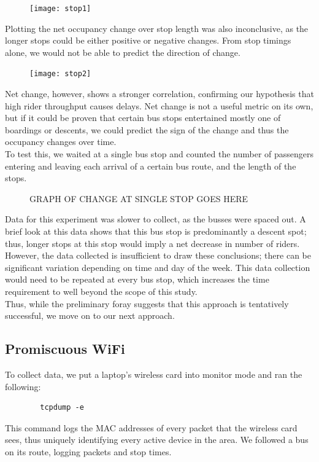 \documentclass[letterpaper,abstract=on,titlepage=false]{scrreprt}
\begin{document}
	\begin{figure}[H]
	\texttt{[image: stop1]}
	\centering
	\end{figure}

	Plotting the net occupancy change over stop length was also inconclusive, as the longer stops could be either positive or negative changes.
	From stop timings alone, we would not be able to predict the direction of change.

	\begin{figure}[H]
	\texttt{[image: stop2]}
	\centering
	\end{figure}

	Net change, however, shows a stronger correlation, confirming our hypothesis that high rider throughput causes delays.
	Net change is not a useful metric on its own, but if it could be proven that certain bus stops entertained mostly one of boardings or descents, we could predict the sign of the change and thus the occupancy changes over time.
	\\
	To test this, we waited at a single bus stop and counted the number of passengers entering and leaving each arrival of a certain bus route, and the length of the stops.

	\begin{figure}[H]
	GRAPH OF CHANGE AT SINGLE STOP GOES HERE
	\centering
	\end{figure}

	Data for this experiment was slower to collect, as the busses were spaced out. A brief look at this data shows that this bus stop is predominantly a descent spot; thus, longer stops at this stop would imply a net decrease in number of riders.
	\\
	However, the data collected is insufficient to draw these conclusions; there can be significant variation depending on time and day of the week.
	This data collection would need to be repeated at every bus stop, which increases the time requirement to well beyond the scope of this study.
	\\
	Thus, while the preliminary foray suggests that this approach is tentatively successful, we move on to our next approach.
	
\subsection*{Promiscuous WiFi}
	To collect data, we put a laptop's wireless card into monitor mode and ran the following:
	\begin{verbatim}
		tcpdump -e
	\end{verbatim}
	This command logs the MAC addresses of every packet that the wireless card sees, thus uniquely identifying every active device in the area.
	We followed a bus on its route, logging packets and stop times.
\end{document}
